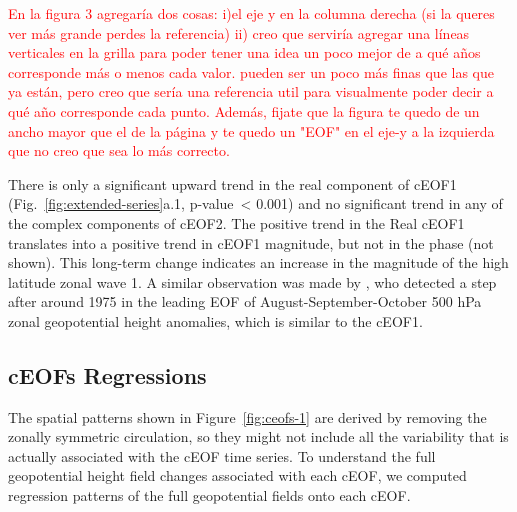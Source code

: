 \documentclass[smallextended]{svjour3}       %
\begin{document}
\textcolor{red}{En la figura 3 agregaría dos cosas: i)el eje y en la columna derecha (si la queres ver más grande perdes la referencia) ii) creo que serviría agregar una líneas verticales en la grilla para poder tener una idea un poco mejor de a qué años corresponde más o menos cada valor. pueden ser un poco más finas que las que ya están, pero creo que sería una referencia util para visualmente poder decir a qué año corresponde cada punto. Además, fijate que la figura te quedo de un ancho mayor que el de la página y te quedo un "EOF" en el eje-y a la izquierda que no creo que sea lo más correcto.}

There is only a significant upward trend in the real component of cEOF1 (Fig.~\ref{fig:extended-series}a.1, p-value~\textless{} 0.001) and no significant trend in any of the complex components of cEOF2.
The positive trend in the Real cEOF1 translates into a positive trend in cEOF1 magnitude, but not in the phase (not shown).
This long-term change indicates an increase in the magnitude of the high latitude zonal wave 1.
A similar observation was made by \citet{raphael2003}, who detected a step after around 1975 in the leading EOF of August-September-October 500 hPa zonal geopotential height anomalies, which is similar to the cEOF1.

\hypertarget{regressions}{%
\subsection{cEOFs Regressions}\label{regressions}}

The spatial patterns shown in Figure~\ref{fig:ceofs-1} are derived by removing the zonally symmetric circulation, so they might not include all the variability that is actually associated with the cEOF time series.
To understand the full geopotential height field changes associated with each cEOF, we computed regression patterns of the full geopotential fields onto each cEOF.
\end{document}
